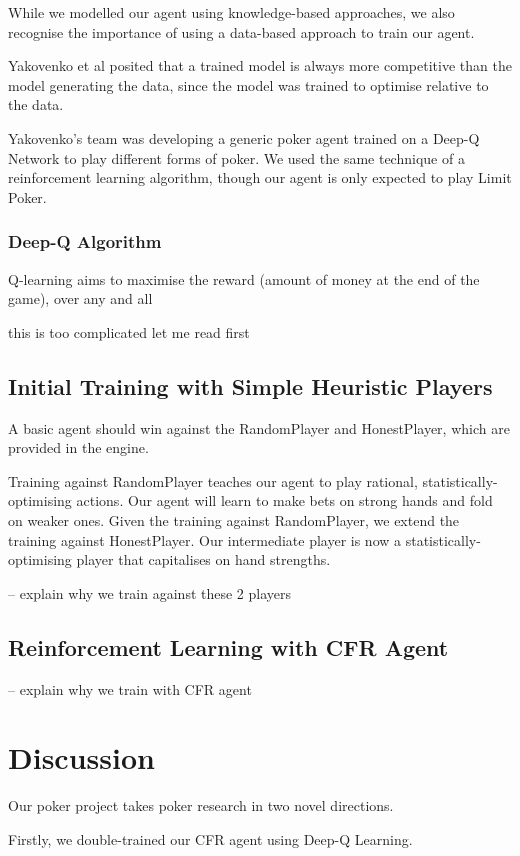 \documentclass{article}
\begin{document}
While we modelled our agent using knowledge-based approaches, we also recognise the importance of using a data-based approach to train our agent. 

Yakovenko et al posited that a trained model is always more competitive than the model generating the data, since the model was trained to optimise relative to the data. 

Yakovenko's team was developing a generic poker agent trained on a Deep-Q Network to play different forms of poker. We used the same technique of a reinforcement learning algorithm, though our agent is only expected to play Limit Poker.

\subsubsection{Deep-Q Algorithm}
Q-learning aims to maximise the reward (amount of money at the end of the game), over any and all

this is too complicated let me read first


\subsection{Initial Training with Simple Heuristic Players}
A basic agent should win against the RandomPlayer and HonestPlayer, which are provided in the engine.

Training against RandomPlayer teaches our agent to play rational, statistically-optimising actions. Our agent will learn to make bets on strong hands and fold on weaker ones. Given the training against RandomPlayer, we extend the training against HonestPlayer. Our intermediate player is now a statistically-optimising player that capitalises on hand strengths.

-- explain why we train against these 2 players

\subsection{Reinforcement Learning with CFR Agent}

-- explain why we train with CFR agent

\section{Discussion}
Our poker project takes poker research in two novel directions.

Firstly, we double-trained our CFR agent using Deep-Q Learning.
\end{document}
